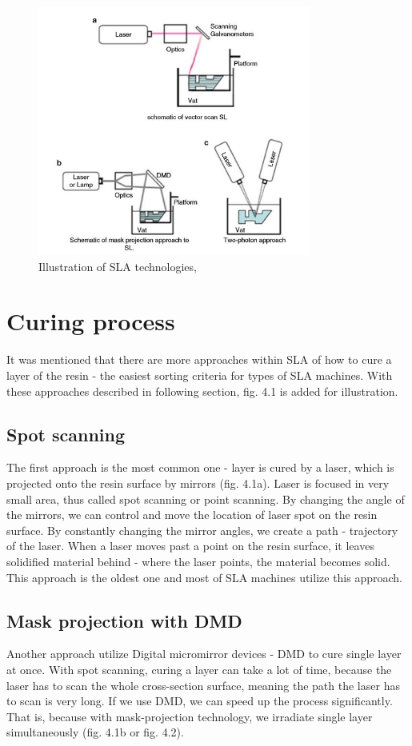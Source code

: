 \documentclass[a4paper, 11pt, reqno]{report}
\begin{document}
\begin{figure}[t]
  \centering
  \includegraphics[width=0.8\textwidth]{SLAillustration}
  \caption{Illustration of SLA technologies, \cite[p. 65]{AMT}}
\end{figure}
%
\section{Curing process} 
It was mentioned that there are more approaches within SLA of how to cure a layer of the resin - the easiest sorting criteria for types of SLA machines. With these approaches described in following section, fig. 4.1 is added for illustration.
\subsection{Spot scanning}
The first approach is the most common one - layer is cured by a laser, which is projected onto the resin surface by mirrors (fig. 4.1a). Laser is focused in very small area, thus called spot scanning or point scanning. By changing the angle of the mirrors, we can control and move the location of laser spot on the resin surface. By constantly changing the mirror angles, we create a path - trajectory of the laser. When a laser moves past a point on the resin surface, it leaves solidified material behind - where the laser points, the material becomes solid. This approach is the oldest one and most of SLA machines utilize this approach.
\subsection{Mask projection with DMD}
Another approach utilize Digital micromirror devices - DMD to cure single layer at once. With spot scanning, curing a layer can take a lot of time, because the laser has to scan the whole cross-section surface, meaning the path the laser has to scan is very long. If we use DMD, we can speed up the process significantly. That is, because with mask-projection technology, we irradiate single layer simultaneously (fig. 4.1b or fig. 4.2).
\end{document}
